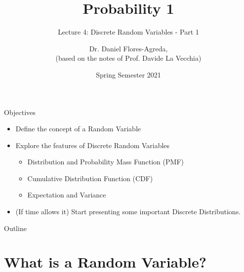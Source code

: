 \documentclass[smaller, handout]{beamer}\usepackage[]{graphicx}\usepackage[]{color}
\begin{document}
\title[S110015]{Probability 1}
\subtitle{Lecture 4: Discrete Random Variables - Part 1}
\author[Flores-Agreda, La Vecchia]{Dr. Daniel Flores-Agreda, \\[0.5em] \tiny{(based on the notes of Prof. Davide La Vecchia)}}
\date{Spring Semester 2021}

\begin{frame}
\titlepage
\end{frame}

\begin{frame}{Objectives}
\begin{itemize}
\item Define the concept of a Random Variable
\bigskip
\item Explore the features of Discrete Random Variables
\bigskip
\begin{itemize}
\item Distribution and Probability Mass Function (PMF)
\bigskip
\item Cumulative Distribution Function (CDF)
\bigskip
\item Expectation and Variance
\end{itemize}
\bigskip
\item (If time allows it) Start presenting some important Discrete Distributions.
\end{itemize}
\end{frame}

\begin{frame}{Outline}
\tableofcontents
\end{frame}

\section{What is a Random Variable?}
\end{document}
